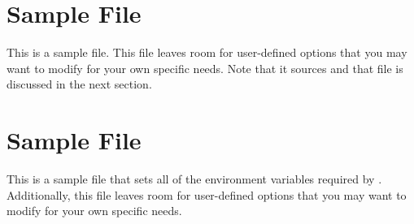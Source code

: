 

\section{Sample  File}
\label{.bashprofile}

This is a sample  file. This file leaves room for
user-defined options that you may want to modify for your own specific
needs.  Note that it sources  and that file is discussed
in the next section.

\footnotesize

\normalsize

\section{Sample  File}
\label{.bashprofile}

This is a sample  file that sets all of the environment
variables required by \draco.  Additionally, this file leaves room for
user-defined options that you may want to modify for your own specific
needs.

\footnotesize

\normalsize

